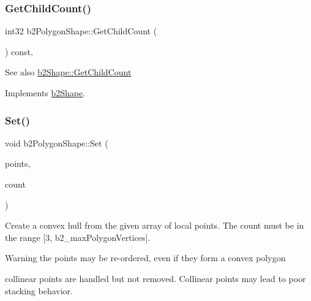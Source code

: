 \mbox{\label{classb2_polygon_shape_aa8bb0d5a88624104425cdee0b2f4427a}} 
\subsubsection{\texorpdfstring{Get\+Child\+Count()}{GetChildCount()}}
{\footnotesize\ttfamily int32 b2\+Polygon\+Shape\+::\+Get\+Child\+Count (\begin{DoxyParamCaption}{ }\end{DoxyParamCaption}) const\hspace{0.3cm}{\ttfamily [override]}, {\ttfamily [virtual]}}

\begin{DoxySeeAlso}{See also}
\hyperlink{classb2_shape_a05a3c445017d96df9238ceefe6ce37ab}{b2\+Shape\+::\+Get\+Child\+Count} 
\end{DoxySeeAlso}


Implements \hyperlink{classb2_shape_a05a3c445017d96df9238ceefe6ce37ab}{b2\+Shape}.

\mbox{\label{classb2_polygon_shape_a4d7b35550509f570814b97325a68966b}} 
\subsubsection{\texorpdfstring{Set()}{Set()}}
{\footnotesize\ttfamily void b2\+Polygon\+Shape\+::\+Set (\begin{DoxyParamCaption}\item[{const \hyperlink{structb2_vec2}{b2\+Vec2} $\ast$}]{points,  }\item[{int32}]{count }\end{DoxyParamCaption})}

Create a convex hull from the given array of local points. The count must be in the range \mbox{[}3, b2\+\_\+max\+Polygon\+Vertices\mbox{]}. \begin{DoxyWarning}{Warning}
the points may be re-\/ordered, even if they form a convex polygon 

collinear points are handled but not removed. Collinear points may lead to poor stacking behavior. 
\end{DoxyWarning}
\mbox{\label{classb2_polygon_shape_a6bb90df8b4a40d1c53b64cc352a855dd}} 

